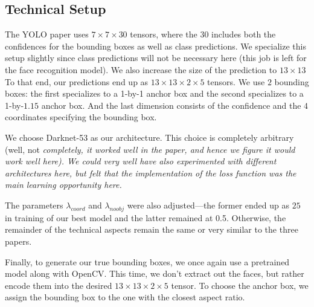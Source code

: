 \subsection{Technical Setup}

The YOLO paper \cite{YOLO} uses $7\times7\times30$ tensors, where the $30$ includes both the confidences for the bounding boxes as well as class predictions.
We specialize this setup slightly since class predictions will not be necessary here (this job is left for the face recognition model).
We also increase the size of the prediction to $13\times13$
To that end, our predictions end up as $13\times13\times2\times5$ tensors.
We use $2$ bounding boxes: the first specializes to a 1-by-1 anchor box and the second specializes to a 1-by-$1.15$ anchor box.
And the last dimension consists of the confidence and the $4$ coordinates specifying the bounding box.

We choose Darknet-53 \cite[Table 1]{YOLOv3} as our architecture.
This choice is completely arbitrary (well, not \it{completely}, it worked well in the paper, and hence we figure it would work well here).
We could very well have also experimented with different architectures here, but felt that the implementation of the loss function was the main learning opportunity here.

The parameters $\lambda_{coord}$ and $\lambda_{noobj}$ were also adjusted---the former ended up as $25$ in training of our best model and the latter remained at 0.5.
Otherwise, the remainder of the technical aspects remain the same or very similar to the three papers.

Finally, to generate our true bounding boxes, we once again use a pretrained model along with OpenCV.
This time, we don't extract out the faces, but rather encode them into the desired $13 \times 13 \times 2 \times 5$ tensor.
To choose the anchor box, we assign the bounding box to the one with the closest aspect ratio.